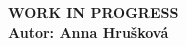 \documentclass[12pt, a4paper]{article}
\begin{document}
\begin{center}
    {\LARGE \textbf{WORK IN PROGRESS}}\\[0.6cm]
    {\large \textbf{Autor: Anna Hrušková}}\\[0.15cm]
\end{center}
\vspace{0.8cm} %








\end{document}
